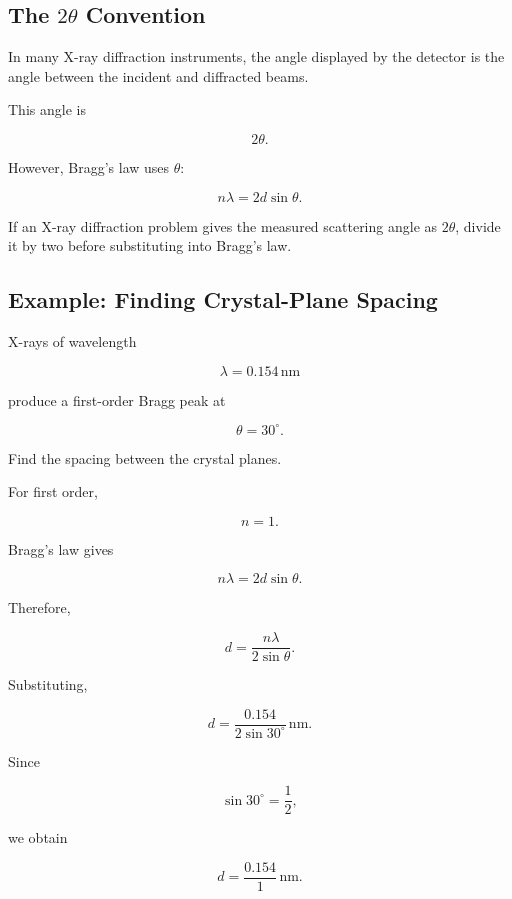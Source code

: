 \documentclass{studentnotes}
\begin{document}
\subsection{The \texorpdfstring{\(2\theta\)}{2\theta} Convention}

In many X-ray diffraction instruments, the angle displayed by the detector is the angle between the incident and diffracted beams.

This angle is

\[
    2\theta.
\]

However, Bragg's law uses \(\theta\):

\[
    n\lambda=2d\sin\theta.
\]

\begin{importantnote}
    If an X-ray diffraction problem gives the measured scattering angle as \(2\theta\), divide it by two before substituting into Bragg's law.
\end{importantnote}

\subsection{Example: Finding Crystal-Plane Spacing}

\begin{example}
    X-rays of wavelength

    \[
        \lambda=0.154\,\text{nm}
    \]

    produce a first-order Bragg peak at

    \[
        \theta=30^\circ.
    \]

    Find the spacing between the crystal planes.
\end{example}

For first order,

\[
    n=1.
\]

Bragg's law gives

\[
    n\lambda
    =
    2d\sin\theta.
\]

Therefore,

\[
    d
    =
    \frac{n\lambda}{2\sin\theta}.
\]

Substituting,

\[
    d
    =
    \frac{0.154}
    {2\sin30^\circ}
    \,\text{nm}.
\]

Since

\[
    \sin30^\circ=\frac12,
\]

we obtain

\[
    d
    =
    \frac{0.154}{1}
    \,\text{nm}.
\]
\end{document}
